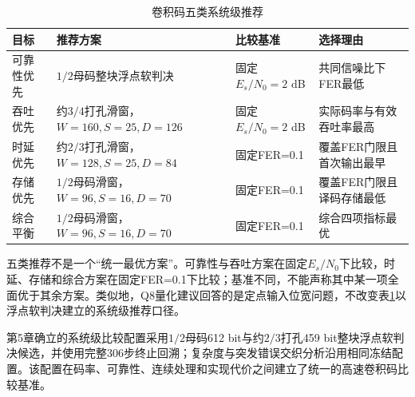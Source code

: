 \begin{table}[htbp]
  \centering
  \scriptsize
  \caption{卷积码五类系统级推荐}
  \label{tab:cc-system-recommendations}
  \begin{tabular}{p{}p{}p{}p{}}
    \toprule
    目标 & 推荐方案 & 比较基准 & 选择理由 \\
    \midrule
    可靠性优先 & $1/2$母码整块浮点软判决 & 固定$E_s/N_0=2$ dB & 共同信噪比下FER最低 \\
    吞吐优先 & 约$3/4$打孔滑窗，$W=160,S=25,D=126$ & 固定$E_s/N_0=2$ dB & 实际码率与有效吞吐率最高 \\
    时延优先 & 约$2/3$打孔滑窗，$W=128,S=25,D=84$ & 固定FER=0.1 & 覆盖FER门限且首次输出最早 \\
    存储优先 & $1/2$母码滑窗，$W=96,S=16,D=70$ & 固定FER=0.1 & 覆盖FER门限且译码存储最低 \\
    综合平衡 & $1/2$母码滑窗，$W=96,S=16,D=70$ & 固定FER=0.1 & 综合四项指标最优 \\
    \bottomrule
  \end{tabular}
\end{table}

五类推荐不是一个“统一最优方案”。可靠性与吞吐方案在固定$E_s/N_0$下比较，时延、存储和综合方案在固定FER=0.1下比较；基准不同，不能声称其中某一项全面优于其余方案。类似地，Q8量化建议回答的是定点输入位宽问题，不改变表\ref{tab:cc-system-recommendations}以浮点软判决建立的系统级推荐口径。

第5章确立的系统级比较配置采用$1/2$母码612 bit与约$2/3$打孔459 bit整块浮点软判决候选，并使用完整306步终止回溯；复杂度与突发错误交织分析沿用相同冻结配置。该配置在码率、可靠性、连续处理和实现代价之间建立了统一的高速卷积码比较基准。
